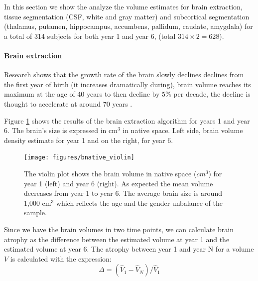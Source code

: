 \documentclass[11pt]{article}
\theoremstyle{definition}
\theoremstyle{remark}
\begin{document}
In this section we show the analyze the volume estimates for brain extraction, tissue segmentation (CSF, white and gray matter) and subcortical segmentation (thalamus, putamen, hippocampus, accumbens, pallidum, caudate, amygdala) for a total of 314 subjects for both year 1 and year 6, (total $314 \times 2 = 628$).

\paragraph*{Brain extraction}

Research shows that the growth rate of the brain slowly declines declines from the first year of birth (it increases dramatically during), brain volume reaches its maximum at the age of 40 years to then decline by $5\%$ per decade, the decline is thought to accelerate at around 70 years \cite{peters2006ageing}.

Figure \ref{fig:brainviolin} shows the results of the brain extraction algorithm for years 1 and year 6. The brain's size is expressed in cm${^3}$ in native space. Left side, brain volume density estimate for year 1 and on the right, for year 6.

\begin{figure}[H]
        \centering
        \texttt{[image: figures/bnative\_violin]}
        \caption{The violin plot shows the brain volume in native space ($cm^3$) for year 1 (left) and year 6 (right). As expected the mean volume decreases from  year 1 to year 6. The average brain size is around 1,000 cm${^3}$ which reflects the age and the gender unbalance of the sample.} 
        \label{fig:brainviolin}
\end{figure}

Since we have the brain volumes in two time points, we can calculate brain atrophy as the difference between the estimated volume at year 1 and the estimated volume at year 6. 
The atrophy between year 1 and year N for a volume $V$ is calculated with the expression:
\begin{equation}
\Delta = (\hat{V}_1 - \hat{V}_N)/ \hat{V}_1
\label{eq:atro}
\end{equation}
\end{document}
